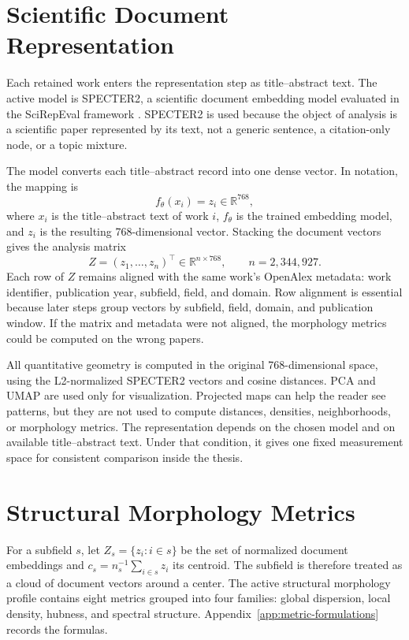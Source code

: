 \section{Scientific Document Representation}

Each retained work enters the representation step as title--abstract text. The active model is SPECTER2, a scientific document embedding model evaluated in the SciRepEval framework \parencite{singh2023scirepeval}. SPECTER2 is used because the object of analysis is a scientific paper represented by its text, not a generic sentence, a citation-only node, or a topic mixture.

The model converts each title--abstract record into one dense vector. In notation, the mapping is
\[
f_{\theta}(x_i)=z_i\in\mathbb{R}^{768},
\]
where \(x_i\) is the title--abstract text of work \(i\), \(f_{\theta}\) is the trained embedding model, and \(z_i\) is the resulting 768-dimensional vector. Stacking the document vectors gives the analysis matrix
\[
Z=(z_1,\ldots,z_n)^\top\in\mathbb{R}^{n\times768},
\qquad n=2{,}344{,}927.
\]
Each row of \(Z\) remains aligned with the same work's OpenAlex metadata: work identifier, publication year, subfield, field, and domain. Row alignment is essential because later steps group vectors by subfield, field, domain, and publication window. If the matrix and metadata were not aligned, the morphology metrics could be computed on the wrong papers.

All quantitative geometry is computed in the original 768-dimensional space, using the L2-normalized SPECTER2 vectors and cosine distances. PCA and UMAP are used only for visualization. Projected maps can help the reader see patterns, but they are not used to compute distances, densities, neighborhoods, or morphology metrics. The representation depends on the chosen model and on available title--abstract text. Under that condition, it gives one fixed measurement space for consistent comparison inside the thesis.

\section{Structural Morphology Metrics}

For a subfield \(s\), let \(Z_s=\{z_i:i\in s\}\) be the set of normalized document embeddings and \(c_s=n_s^{-1}\sum_{i\in s}z_i\) its centroid. The subfield is therefore treated as a cloud of document vectors around a center. The active structural morphology profile contains eight metrics grouped into four families: global dispersion, local density, hubness, and spectral structure. Appendix~\ref{app:metric-formulations} records the formulas.

